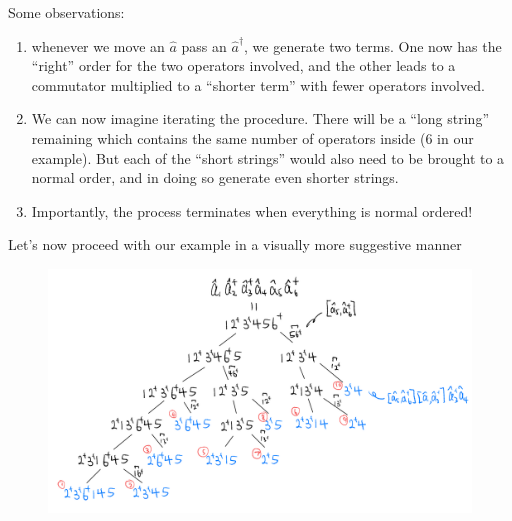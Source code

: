 Some observations:
\begin{enumerate}
    \item whenever we move an $\hat{a}$ pass an $\hat{a}^\dagger$, we generate two terms. One now has the ``right'' order for the two operators involved, and the other leads to a commutator multiplied to a ``shorter term'' with fewer operators involved.
    \item We can now imagine iterating the procedure. There will be a ``long string'' remaining which contains the same number of operators inside ($6$ in our example). But each of the ``short strings'' would also need to be brought to a normal order, and in doing so generate even shorter strings.
    \item Importantly, the process terminates when everything is normal ordered!
\end{enumerate}

Let's now proceed with our example in a visually more suggestive manner

\begin{figure}[ht]
    \centering
    \includegraphics[width=\textwidth]{jupyterbook/data/fig/lec10-fig00.png}
\end{figure}
\newpage

